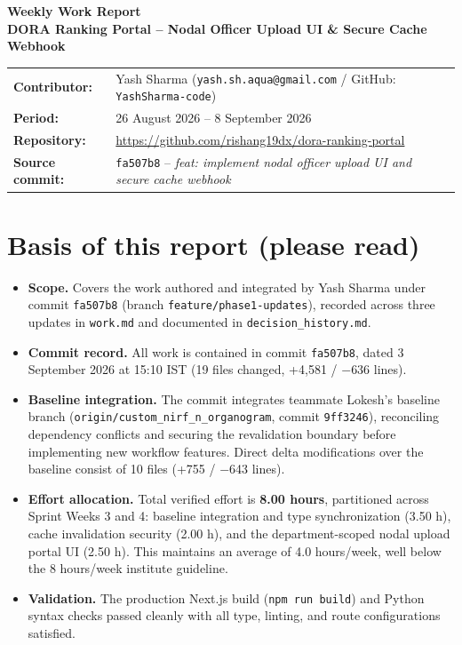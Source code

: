 \documentclass[11pt,a4paper]{article}
\begin{document}
{\Large\bfseries Weekly Work Report}\\[4pt]
{\large\bfseries\color{primary} DORA Ranking Portal -- Nodal Officer Upload UI \& Secure Cache Webhook}\\[6pt]
\begin{tabular}{@{}ll@{}}
\textbf{Contributor:} & Yash Sharma (\texttt{yash.sh.aqua@gmail.com} / GitHub: \texttt{YashSharma-code}) \\
\textbf{Period:} & 26 August 2026 -- 8 September 2026 \\
\textbf{Repository:} & \url{https://github.com/rishang19dx/dora-ranking-portal} \\
\textbf{Source commit:} & \texttt{fa507b8} -- \textit{feat: implement nodal officer upload UI and secure cache webhook}
\end{tabular}

\vspace{0.4cm}
\section*{Basis of this report (please read)}
\begin{itemize}[leftmargin=1.4em, itemsep=2pt]
\item \textbf{Scope.} Covers the work authored and integrated by Yash Sharma under commit \texttt{fa507b8} (branch \texttt{feature/phase1-updates}), recorded across three updates in \texttt{work.md} and documented in \texttt{decision\_history.md}.
\item \textbf{Commit record.} All work is contained in commit \texttt{fa507b8}, dated 3 September 2026 at 15:10 IST (19 files changed, +4,581 / $-$636 lines).
\item \textbf{Baseline integration.} The commit integrates teammate Lokesh's baseline branch (\texttt{origin/custom\_nirf\_n\_organogram}, commit \texttt{9ff3246}), reconciling dependency conflicts and securing the revalidation boundary before implementing new workflow features. Direct delta modifications over the baseline consist of 10 files (+755 / $-$643 lines).
\item \textbf{Effort allocation.} Total verified effort is \textbf{8.00 hours}, partitioned across Sprint Weeks 3 and 4: baseline integration and type synchronization (3.50 h), cache invalidation security (2.00 h), and the department-scoped nodal upload portal UI (2.50 h). This maintains an average of 4.0 hours/week, well below the 8 hours/week institute guideline.
\item \textbf{Validation.} The production Next.js build (\texttt{npm run build}) and Python syntax checks passed cleanly with all type, linting, and route configurations satisfied.
\end{itemize}
\end{document}
